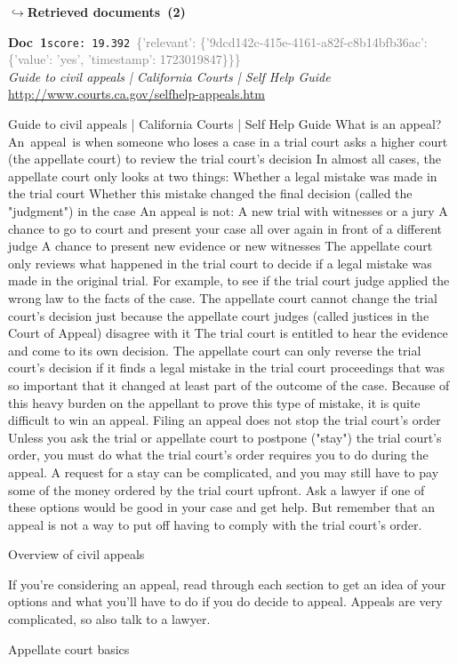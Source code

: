 \documentclass[a4paper,11pt]{article}
\begin{document}
\noindent\hfill{\footnotesize\textcolor{doccolor}{\textbf{$\hookrightarrow$\enspace Retrieved documents~(2)}}}
\begin{docenv}
{\footnotesize\textcolor{doccolor}{\textbf{Doc~1}}}\hfill{\tiny\texttt{score:~19.392}}\ {\tiny\textcolor{gray}{\{'relevant': \{'9dcd142c-415e-4161-a82f-c8b14bfb36ac': \{'value': 'yes', 'timestamp': 1723019847\}\}\}}}\\[3pt]
{\small\textit{Guide to civil appeals | California Courts | Self Help Guide}}\\[2pt]
{\tiny\url{http://www.courts.ca.gov/selfhelp-appeals.htm}}\\[4pt]
{\footnotesize Guide to civil appeals | California Courts | Self Help Guide
What is an appeal?
An appeal is when someone who loses a case in a trial court asks a higher court (the appellate court) to review the trial court's decision
In almost all cases, the appellate court only looks at two things:
Whether a legal mistake was made in the trial court
Whether this mistake changed the final decision (called the "judgment") in the case
An appeal is not:
A new trial with witnesses or a jury
A chance to go to court and present your case all over again in front of a different judge
A chance to present new evidence or new witnesses
The appellate court only reviews what happened in the trial court to decide if a legal mistake was made in the original trial. For example, to see if the trial court judge applied the wrong law to the facts of the case.
The appellate court cannot change the trial court's decision just because the appellate court judges (called justices in the Court of Appeal) disagree with it
The trial court is entitled to hear the evidence and come to its own decision. The appellate court can only reverse the trial court's decision if it finds a legal mistake in the trial court proceedings that was so important that it changed at least part of the outcome of the case. Because of this heavy burden on the appellant to prove this type of mistake, it is quite difficult to win an appeal.
Filing an appeal does not stop the trial court's order
Unless you ask the trial or appellate court to postpone ("stay") the trial court's order, you must do what the trial court's order requires you to do during the appeal. A request for a stay can be complicated, and you may still have to pay some of the money ordered by the trial court upfront. Ask a lawyer if one of these options would be good in your case and get help. But remember that an appeal is not a way to put off having to comply with the trial court's order.

Overview of civil appeals

If you're considering an appeal, read through each section to get an idea of your options and what you'll have to do if you do decide to appeal. Appeals are very complicated, so also talk to a lawyer. 

Appellate court basics}
\end{docenv}
\end{document}
